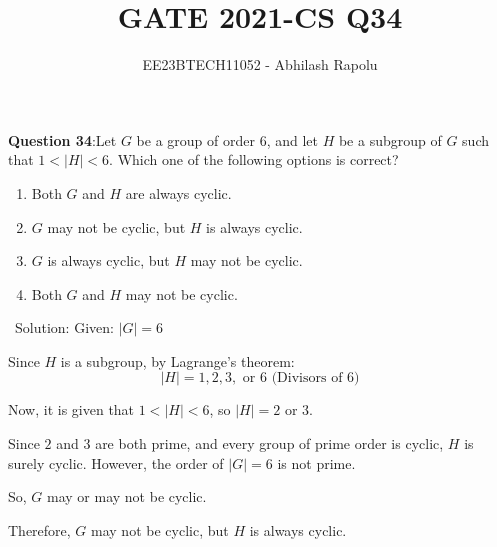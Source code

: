 \documentclass[journal,12pt,twocolumn]{IEEEtran}
\title{GATE 2021-CS Q34}
\author{EE23BTECH11052 - Abhilash Rapolu}
\begin{document}
\maketitle
\newpage
\textbf{Question 34}:Let $G$ be a group of order $6$, and let $H$ be a subgroup of $G$ such that $1 < |H| < 6$. Which one of the following options is correct?
\begin{enumerate}
    \item Both $G$ and $H$ are always cyclic.
    \item $G$ may not be cyclic, but $H$ is always cyclic.
    \item $G$ is always cyclic, but $H$ may not be cyclic.
    \item Both $G$ and $H$ may not be cyclic.
\end{enumerate}
\ Solution:
Given: $|G| = 6$

Since $H$ is a subgroup, by Lagrange's theorem:
\[ |H| = 1, 2, 3, \text{ or } 6 \text{ (Divisors of } 6) \]

Now, it is given that $1 < |H| < 6$, so $|H| = 2$ or $3$.

Since $2$ and $3$ are both prime, and every group of prime order is cyclic, $H$ is surely cyclic. However, the order of $|G| = 6$ is not prime.

So, $G$ may or may not be cyclic.

Therefore, $G$ may not be cyclic, but $H$ is always cyclic.
\end{document}
